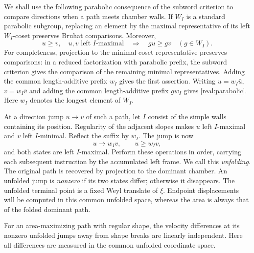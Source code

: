 We shall use the following parabolic consequence of the subword
criterion to compare directions when a path meets chamber walls.
If $W_I$ is a standard parabolic subgroup, replacing an element by
the maximal representative of its left $W_I$-coset preserves Bruhat
comparisons.  Moreover,
\begin{equation}\label{real:parabolic}
 u\ge v,\quad u,v\text{ left }I\text{-maximal}
 \quad\Longrightarrow\quad gu\ge gv\quad(g\in W_I).
\end{equation}
For completeness, projection to the minimal coset representative
preserves comparisons: in a reduced factorization with parabolic
prefix, the subword criterion gives the comparison of the remaining
minimal representatives.  Adding the common length-additive prefix
$w_I$ gives the first assertion.  Writing
$u=w_I\bar u$, $v=w_I\bar v$ and adding the common
length-additive prefix $gw_I$ gives \eqref{real:parabolic}.
Here $w_I$ denotes the longest element of $W_I$.

At a direction jump $u\to v$ of such a path, let $I$ consist of the
simple walls containing its position.  Regularity of the adjacent
slopes makes $u$ left $I$-maximal and $v$ left $I$-minimal.  Reflect
the suffix by $w_I$.  The jump is now
\begin{equation}\label{real:unfolded-jump}
 u\longrightarrow w_Iv,\qquad u\ge w_Iv,
\end{equation}
and both states are left $I$-maximal.  Perform these operations in
order, carrying each subsequent instruction by the accumulated
left frame.  We call this \emph{unfolding}.  The original path is
recovered by projection to the dominant chamber.  An unfolded jump
is \emph{nonzero} if its two states differ; otherwise it disappears.
The unfolded terminal point is a fixed Weyl translate of $\xi$.
Endpoint displacements will be computed in this common unfolded
space, whereas the area is always that of the folded dominant path.

\begin{lemma}\label{real:variation}
For an area-maximizing path with regular shape, the velocity differences
at its nonzero unfolded jumps away from shape breaks are linearly
independent.  Here all differences are measured in the common unfolded
coordinate space.
\end{lemma}

